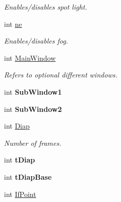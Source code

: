 \begin{DoxyCompactItemize}
\begin{DoxyCompactList}\small\item\em Enables/disables spot light. \end{DoxyCompactList}\item 
int \hyperlink{classDraw_a3bf1137663f19e5c361c845cf4dfb7db}{ne}\hypertarget{classDraw_a3bf1137663f19e5c361c845cf4dfb7db}{}\label{classDraw_a3bf1137663f19e5c361c845cf4dfb7db}

\begin{DoxyCompactList}\small\item\em Enables/disables fog. \end{DoxyCompactList}\item 
int \hyperlink{classDraw_a5123239dd409d2f813d6f4a39a93a560}{Main\+Window}\hypertarget{classDraw_a5123239dd409d2f813d6f4a39a93a560}{}\label{classDraw_a5123239dd409d2f813d6f4a39a93a560}

\begin{DoxyCompactList}\small\item\em Refers to optional different windows. \end{DoxyCompactList}\item 
int {\bfseries Sub\+Window1}\hypertarget{classDraw_a74c5901821f0f6af7ab263d68531cec7}{}\label{classDraw_a74c5901821f0f6af7ab263d68531cec7}

\item 
int {\bfseries Sub\+Window2}\hypertarget{classDraw_a173b380ef4c4936a84d502de1aba75fe}{}\label{classDraw_a173b380ef4c4936a84d502de1aba75fe}

\item 
int \hyperlink{classDraw_a5552c93f6dc60d50f083dba82fc5b6cd}{Diap}\hypertarget{classDraw_a5552c93f6dc60d50f083dba82fc5b6cd}{}\label{classDraw_a5552c93f6dc60d50f083dba82fc5b6cd}

\begin{DoxyCompactList}\small\item\em Number of frames. \end{DoxyCompactList}\item 
int {\bfseries t\+Diap}\hypertarget{classDraw_acbff79358479b6a19d039b6ec5ddaf0d}{}\label{classDraw_acbff79358479b6a19d039b6ec5ddaf0d}

\item 
int {\bfseries t\+Diap\+Base}\hypertarget{classDraw_a59c57b93252d1e0fca068a43c3a231e3}{}\label{classDraw_a59c57b93252d1e0fca068a43c3a231e3}

\item 
int \hyperlink{classDraw_a4bd038ddc170e76bc94d37feb742667c}{If\+Point}\hypertarget{classDraw_a4bd038ddc170e76bc94d37feb742667c}{}\label{classDraw_a4bd038ddc170e76bc94d37feb742667c}


\end{DoxyCompactItemize}
